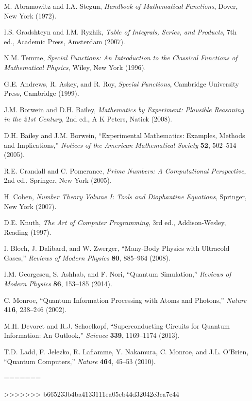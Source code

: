 \documentclass[11pt]{article}
\theoremstyle{plain}
\theoremstyle{definition}
\theoremstyle{remark}
\begin{document}
\begin{thebibliography}{99}
 M. Abramowitz and I.A. Stegun, \emph{Handbook of Mathematical Functions}, Dover, New York (1972).

 I.S. Gradshteyn and I.M. Ryzhik, \emph{Table of Integrals, Series, and Products}, 7th ed., Academic Press, Amsterdam (2007).

 N.M. Temme, \emph{Special Functions: An Introduction to the Classical Functions of Mathematical Physics}, Wiley, New York (1996).

 G.E. Andrews, R. Askey, and R. Roy, \emph{Special Functions}, Cambridge University Press, Cambridge (1999).

 J.M. Borwein and D.H. Bailey, \emph{Mathematics by Experiment: Plausible Reasoning in the 21st Century}, 2nd ed., A K Peters, Natick (2008).

 D.H. Bailey and J.M. Borwein, ``Experimental Mathematics: Examples, Methods and Implications,'' \emph{Notices of the American Mathematical Society} \textbf{52}, 502--514 (2005).

 R.E. Crandall and C. Pomerance, \emph{Prime Numbers: A Computational Perspective}, 2nd ed., Springer, New York (2005).

 H. Cohen, \emph{Number Theory Volume I: Tools and Diophantine Equations}, Springer, New York (2007).

 D.E. Knuth, \emph{The Art of Computer Programming}, 3rd ed., Addison-Wesley, Reading (1997).

 I. Bloch, J. Dalibard, and W. Zwerger, ``Many-Body Physics with Ultracold Gases,'' \emph{Reviews of Modern Physics} \textbf{80}, 885--964 (2008).

 I.M. Georgescu, S. Ashhab, and F. Nori, ``Quantum Simulation,'' \emph{Reviews of Modern Physics} \textbf{86}, 153--185 (2014).

 C. Monroe, ``Quantum Information Processing with Atoms and Photons,'' \emph{Nature} \textbf{416}, 238--246 (2002).

 M.H. Devoret and R.J. Schoelkopf, ``Superconducting Circuits for Quantum Information: An Outlook,'' \emph{Science} \textbf{339}, 1169--1174 (2013).

 T.D. Ladd, F. Jelezko, R. Laflamme, Y. Nakamura, C. Monroe, and J.L. O'Brien, ``Quantum Computers,'' \emph{Nature} \textbf{464}, 45--53 (2010).

\end{thebibliography}
=======

>>>>>>> b665233b4ba4133111ea05cb44d32042e3ca7e44
\end{document}
